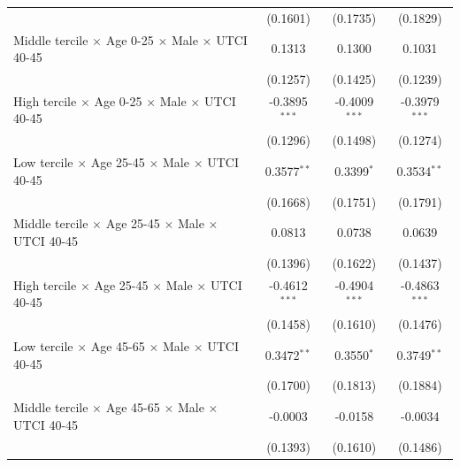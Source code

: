 \begin{table}[htbp]
\begin{tabular}{lccc}
                                                                                & (0.1601)        & (0.1735)          & (0.1829)\\   
      Middle tercile $\times$ Age 0-25 $\times$ Male $\times$ UTCI 40-45        & 0.1313          & 0.1300            & 0.1031\\   
                                                                                & (0.1257)        & (0.1425)          & (0.1239)\\   
      High tercile $\times$ Age 0-25 $\times$ Male $\times$ UTCI 40-45          & -0.3895$^{***}$ & -0.4009$^{***}$   & -0.3979$^{***}$\\   
                                                                                & (0.1296)        & (0.1498)          & (0.1274)\\   
      Low tercile $\times$ Age 25-45 $\times$ Male $\times$ UTCI 40-45          & 0.3577$^{**}$   & 0.3399$^{*}$      & 0.3534$^{**}$\\   
                                                                                & (0.1668)        & (0.1751)          & (0.1791)\\   
      Middle tercile $\times$ Age 25-45 $\times$ Male $\times$ UTCI 40-45       & 0.0813          & 0.0738            & 0.0639\\   
                                                                                & (0.1396)        & (0.1622)          & (0.1437)\\   
      High tercile $\times$ Age 25-45 $\times$ Male $\times$ UTCI 40-45         & -0.4612$^{***}$ & -0.4904$^{***}$   & -0.4863$^{***}$\\   
                                                                                & (0.1458)        & (0.1610)          & (0.1476)\\   
      Low tercile $\times$ Age 45-65 $\times$ Male $\times$ UTCI 40-45          & 0.3472$^{**}$   & 0.3550$^{*}$      & 0.3749$^{**}$\\   
                                                                                & (0.1700)        & (0.1813)          & (0.1884)\\   
      Middle tercile $\times$ Age 45-65 $\times$ Male $\times$ UTCI 40-45       & -0.0003         & -0.0158           & -0.0034\\   
                                                                                & (0.1393)        & (0.1610)          & (0.1486)\\   

\end{tabular}
\end{table}
